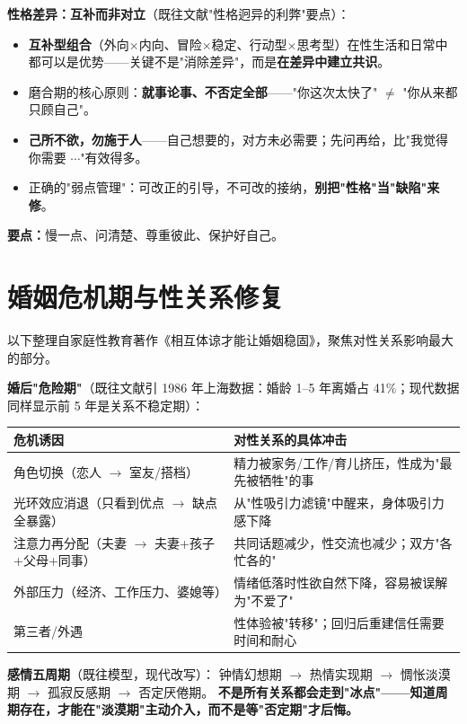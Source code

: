 \documentclass[12pt,UTF8,openany]{ctexbook}
\begin{document}
\textbf{性格差异：互补而非对立}（既往文献"性格迥异的利弊"要点）：

\begin{itemize}[leftmargin=2em,itemsep=0.3em]
  \item \textbf{互补型组合}（外向×内向、冒险×稳定、行动型×思考型）在性生活和日常中都可以是优势——关键不是"消除差异"，而是\textbf{在差异中建立共识}。
  \item 磨合期的核心原则：\textbf{就事论事、不否定全部}——"你这次太快了" $\ne$ "你从来都只顾自己"。
  \item \textbf{己所不欲，勿施于人}——自己想要的，对方未必需要；先问再给，比"我觉得你需要 $\cdots$"有效得多。
  \item 正确的"弱点管理"：可改正的引导，不可改的接纳，\textbf{别把"性格"当"缺陷"来修}。
\end{itemize}

\vspace{1em}
\noindent\textbf{要点：}慢一点、问清楚、尊重彼此、保护好自己。
\section{婚姻危机期与性关系修复}

以下整理自家庭性教育著作《相互体谅才能让婚姻稳固》，聚焦对性关系影响最大的部分。

\textbf{婚后"危险期"}（既往文献引 1986 年上海数据：婚龄 1--5 年离婚占 41\%；现代数据同样显示前 5 年是关系不稳定期）：

\begin{tabularx}{\textwidth}{@{}l X@{}}
\toprule
\textbf{危机诱因} & \textbf{对性关系的具体冲击} \\
\midrule
角色切换（恋人 $\to$ 室友/搭档） & 精力被家务/工作/育儿挤压，性成为"最先被牺牲"的事 \\
光环效应消退（只看到优点 $\to$ 缺点全暴露） & 从"性吸引力滤镜"中醒来，身体吸引力感下降 \\
注意力再分配（夫妻 $\to$ 夫妻+孩子+父母+同事） & 共同话题减少，性交流也减少；双方"各忙各的" \\
外部压力（经济、工作压力、婆媳等） & 情绪低落时性欲自然下降，容易被误解为"不爱了" \\
第三者/外遇 & 性体验被"转移"；回归后重建信任需要时间和耐心 \\
\bottomrule
\end{tabularx}

\vspace{1em}
\noindent\textbf{感情五周期}（既往模型，现代改写）：
钟情幻想期 $\to$ 热情实现期 $\to$ 惆怅淡漠期 $\to$ 孤寂反感期 $\to$ 否定厌倦期。
\textbf{不是所有关系都会走到"冰点"——知道周期存在，才能在"淡漠期"主动介入，而不是等"否定期"才后悔。}
\end{document}
